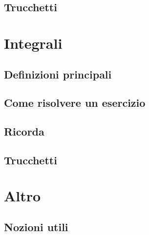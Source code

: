 \documentclass[a4paper,10pt]{book}
\begin{document}
\subsection{Trucchetti}
\section{Integrali}
\subsection{Definizioni principali}

\subsection{Come risolvere un esercizio}

\subsection{Ricorda}
\subsection{Trucchetti}
\section{Altro}

\subsection{Nozioni utili}
\end{document}
